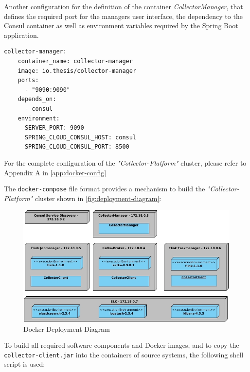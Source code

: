 Another configuration for the definition of the container \textit{CollectorManager}, that defines the required port for the managers user
interface, the dependency to the Consul container as well as environment variables required by the Spring Boot application.

\begin{lstlisting}[caption={CollectorManager container configuration}, captionpos=b, label={lst:docker-manager}]
  collector-manager:
    container_name: collector-manager
    image: io.thesis/collector-manager
    ports:
      - "9090:9090"
    depends_on:
      - consul
    environment:
      SERVER_PORT: 9090
      SPRING_CLOUD_CONSUL_HOST: consul
      SPRING_CLOUD_CONSUL_PORT: 8500
\end{lstlisting}

For the complete configuration of the \textit{"Collector-Platform"} cluster, please refer to Appendix A in \autoref{app:docker-config}

The \verb|docker-compose| file format provides a mechanism to build the \textit{"Collector-Platform"} cluster shown in
\autoref{fig:deployment-diagram}:

\begin{figure}[H]
	\centering
	\includegraphics[width=1.0\textwidth]{../uml/deployment-diagram.jpg}
	\caption{Docker Deployment Diagram}
	\label{fig:deployment-diagram}
\end{figure}

To build all required software components and Docker images, and to copy the \verb|collector-client.jar| into the containers of source systems,
the following shell script is used:


